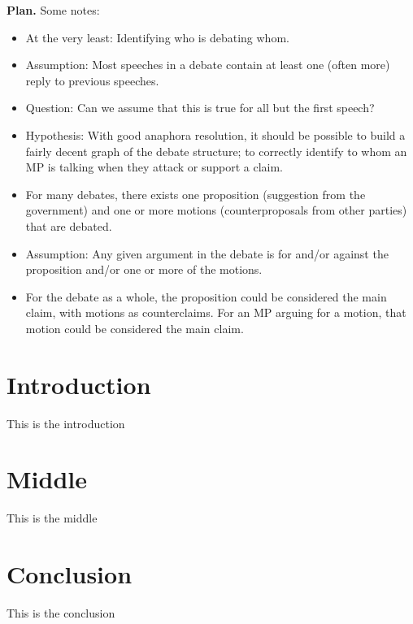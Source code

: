 \UseRawInputEncoding


\textbf{Plan.} Some notes:

\begin{itemize}
    \item At the very least: Identifying who is debating whom.
    \item Assumption: Most speeches in a debate contain at least one (often more) reply to previous speeches.
    \item Question: Can we assume that this is true for all but the first speech?
    \item Hypothesis: With good anaphora resolution, it should be possible to build a fairly decent graph of the debate structure; to correctly identify to whom an MP is talking when they attack or support a claim.
    \item For many debates, there exists one proposition (suggestion from the government) and one or more motions (counterproposals from other parties) that are debated.
    \item Assumption: Any given argument in the debate is for and/or against the proposition and/or one or more of the motions.
    \item For the debate as a whole, the proposition could be considered the main claim, with motions as counterclaims. For an MP arguing for a motion, that motion could be considered the main claim.
\end{itemize}

\section{Introduction}

This is the introduction

\section{Middle}

This is the middle

\section{Conclusion}

This is the conclusion